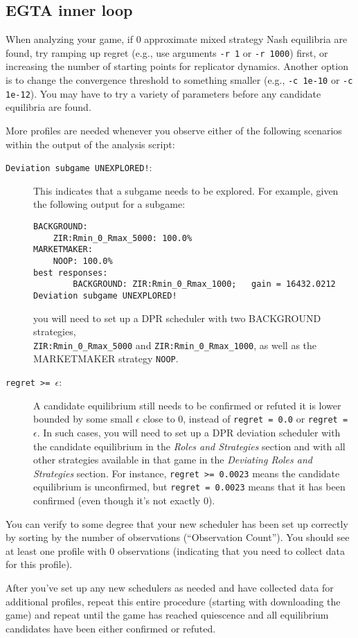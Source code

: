 \documentclass[11pt]{article}
\begin{document}
\subsection{EGTA inner loop}
\label{sec:innerloop}

When analyzing your game, if 0 approximate mixed strategy Nash equilibria are found, try ramping up regret (e.g., use arguments \verb|-r 1| or \verb|-r 1000|) first, or increasing the number of starting points for replicator dynamics.
Another option is to change the convergence threshold to something smaller (e.g., \verb|-c 1e-10| or \verb|-c 1e-12|). You may have to try a variety of parameters before any candidate equilibria are found.

More profiles are needed whenever you observe either of the following scenarios within the output of the analysis script:
\begin{description}
\item[\texttt{Deviation subgame UNEXPLORED!}:] This indicates that a subgame needs to be explored.
For example, given the following output for a subgame:
\begin{verbatim}
BACKGROUND:
    ZIR:Rmin_0_Rmax_5000: 100.0%
MARKETMAKER:
    NOOP: 100.0%
best responses:
        BACKGROUND: ZIR:Rmin_0_Rmax_1000;   gain = 16432.0212
Deviation subgame UNEXPLORED!
\end{verbatim}
you will need to set up a DPR scheduler with two BACKGROUND strategies, \\
\verb|ZIR:Rmin_0_Rmax_5000| and \verb|ZIR:Rmin_0_Rmax_1000|, as well as the MARKETMAKER strategy \verb|NOOP|.

\item[\texttt{regret >= $\epsilon$}:] A candidate equilibrium still needs to be confirmed or refuted it is lower bounded by some small $\epsilon$ close to 0, instead of \verb|regret = 0.0| or \verb|regret = |$\epsilon$.  In such cases, you will need to set up a DPR deviation scheduler with the candidate equilibrium in the \emph{Roles and Strategies} section and with all other strategies available in that game in the \emph{Deviating Roles and Strategies} section.
For instance, \verb|regret >= 0.0023| means the candidate equilibrium is unconfirmed, but \verb|regret = 0.0023| means that it has been confirmed (even though it's not exactly 0).

\end{description}
You can verify to some degree that your new scheduler has been set up correctly by sorting by the number of observations (``Observation Count''). You should see at least one profile with 0 observations (indicating that you need to collect data for this profile).

After you've set up any new schedulers as needed and have collected data for additional profiles, repeat this entire procedure (starting with downloading the game) and repeat until the game has reached quiescence and all equilibrium candidates have been either confirmed or refuted.



\end{document}
